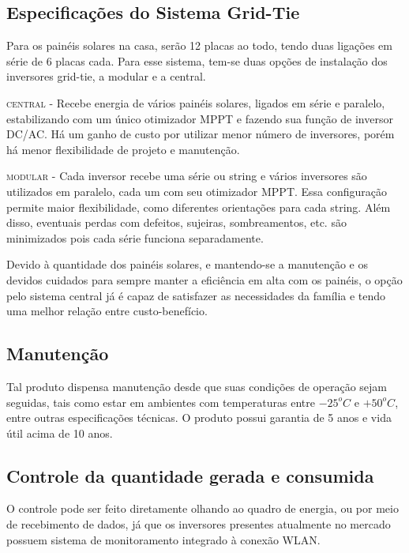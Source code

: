 \subsection{Especificações do Sistema Grid-Tie}

	Para os painéis solares na casa, serão 12 placas ao todo, tendo duas ligações em série de 6 placas cada. Para esse sistema, tem-se duas opções de instalação dos inversores grid-tie, a modular e a central.

	\textsc{central} - Recebe energia de vários painéis solares, ligados em série e paralelo, estabilizando com um único otimizador MPPT e fazendo sua função de inversor DC/AC. Há um ganho de custo por utilizar menor número de inversores, porém há menor flexibilidade de projeto e manutenção.

	\textsc{modular} - Cada inversor recebe uma série ou string e vários inversores são utilizados em paralelo, cada um com seu otimizador MPPT. Essa configuração permite maior flexibilidade, como diferentes orientações para cada string. Além disso, eventuais perdas com defeitos, sujeiras, sombreamentos, etc. são minimizados pois cada série funciona separadamente.

	Devido à quantidade dos painéis solares, e mantendo-se a manutenção e os devidos cuidados para sempre manter a eficiência em alta com os painéis, o opção pelo sistema central já é capaz de satisfazer as necessidades da família e tendo uma melhor relação entre custo-benefício.

\subsection{Manutenção}

	Tal produto dispensa manutenção desde que suas condições de operação sejam seguidas, tais como estar em ambientes com temperaturas entre $-25^oC$ e $+50^oC$, entre outras especificações técnicas. O produto possui garantia de 5 anos e vida útil acima de 10 anos.


\subsection{Controle da quantidade gerada e consumida}

	O controle pode ser feito diretamente olhando ao quadro de energia, ou por meio de recebimento de dados, já que os inversores presentes atualmente no mercado possuem sistema de monitoramento integrado à conexão WLAN.


